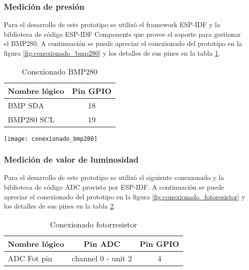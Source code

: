 \subsubsection{Medición de presión}
Para el desarrollo de este prototipo se utilizó el framework ESP-IDF y la biblioteca de código ESP-IDF Components que provee el soporte para gestionar el BMP280. A continuación se puede apreciar el conexionado del prototipo en la figura \ref{fig:conexionado_bmp280} y los detalles de sus pines en la tabla \ref{tab:conexionado_bmp280}.

\vspace{0.5cm}    
\begin{table}[h]
\centering
\caption[Conexionado BMP280]{Conexionado BMP280}
\begin{tabular}{l c }
\toprule
\textbf{Nombre lógico} &  \textbf{Pin GPIO}\\
\midrule
 BMP SDA & 18 \\
 BMP280 SCL & 19  \\
\bottomrule
\hline
\end{tabular}
\label{tab:conexionado_bmp280} 
\end{table}
    
\vspace{0.5cm}    
\begin{center}
  \texttt{[image: conexionado\_bmp280]}
    \label{fig:conexionado_bmp280}
\end{center}




\subsubsection{Medición de valor de luminosidad}
Para el desarrollo de este prototipo se utilizó el siguiente conexionado y la biblioteca de código ADC provista por ESP-IDF. A continuación se puede apreciar el conexionado del prototipo en la figura \ref{fig:conexionado_fotoresistor} y los detalles de sus pines en la tabla \ref{tab:conexionado_fotoresistor}.

\vspace{0.5cm}    
\begin{table}[h]
\centering
\caption[Conexionado fotorresistor]{Conexionado fotorresistor}
\begin{tabular}{l c c}
\toprule
\textbf{Nombre lógico} & \textbf{Pin ADC} & \textbf{Pin GPIO}\\
\midrule
ADC Fot pin & channel 0 - unit 2 & 4\\
\bottomrule
\hline
\end{tabular}
\label{tab:conexionado_fotoresistor}
\end{table}


